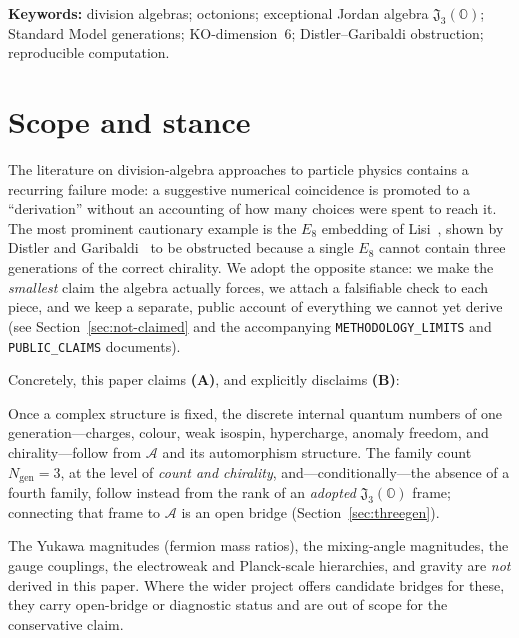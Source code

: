 \documentclass[11pt,a4paper]{article}
\theoremstyle{plain}
\newcommand{\Alg}{\mathcal{A}}
\newcommand{\JO}{\mathfrak{J}_3(\mathbb{O})}
\newcommand{\code}[1]{\texttt{#1}}
\begin{document}
\noindent\textbf{Keywords:}\; division algebras; octonions; exceptional Jordan
algebra $\JO$; Standard Model generations; KO-dimension~6; Distler--Garibaldi
obstruction; reproducible computation.

\bigskip

\section{Scope and stance}
\label{sec:scope}

The literature on division-algebra approaches to particle physics contains a
recurring failure mode: a suggestive numerical coincidence is promoted to a
``derivation'' without an accounting of how many choices were spent to reach it.
The most prominent cautionary example is the $E_8$ embedding of
Lisi~\cite{lisi2007}, shown by Distler and Garibaldi~\cite{distler2010} to be
obstructed because a single $E_8$
cannot contain three generations of the correct chirality. We adopt the opposite
stance: we make the \emph{smallest} claim the algebra actually forces, we attach a
falsifiable check to each piece, and we keep a separate, public account of
everything we cannot yet derive (see Section~\ref{sec:not-claimed} and the
accompanying \code{METHODOLOGY\_LIMITS} and \code{PUBLIC\_CLAIMS} documents).

Concretely, this paper claims \textbf{(A)}, and explicitly disclaims \textbf{(B)}:

\begin{description}[leftmargin=2.2em,style=nextline]
\item[(A) --- claimed.] Once a complex structure is fixed, the discrete internal
  quantum numbers of one generation---charges, colour, weak isospin, hypercharge,
  anomaly freedom, and chirality---follow from $\Alg$ and its automorphism
  structure. The family count $N_{\mathrm{gen}}=3$, at the level of \emph{count and
  chirality}, and---conditionally---the absence of a fourth family, follow instead
  from the rank of an \emph{adopted} $\JO$ frame; connecting that frame to $\Alg$
  is an open bridge (Section~\ref{sec:threegen}).
\item[(B) --- disclaimed here.] The Yukawa magnitudes (fermion mass ratios), the
  mixing-angle magnitudes, the gauge couplings, the electroweak and Planck-scale
  hierarchies, and gravity are \emph{not} derived in this paper. Where the wider
  project offers candidate bridges for these, they carry open-bridge or diagnostic
  status and are out of scope for the conservative claim.
\end{description}
\end{document}
